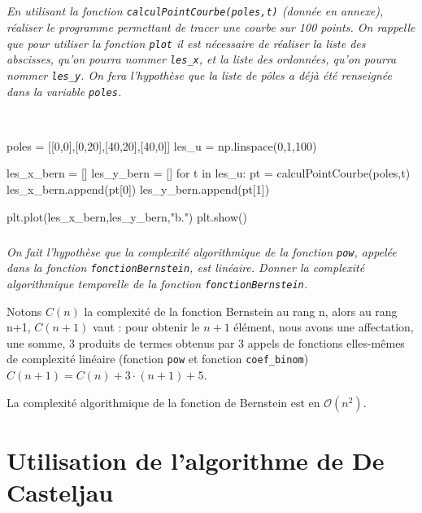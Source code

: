 \documentclass[10pt,fleqn]{article} %
\begin{document}
\subparagraph{}
\textit{En utilisant la fonction \texttt{calculPointCourbe(poles,t)} (donnée en annexe), réaliser le programme permettant de tracer une courbe sur 100 points. 
On rappelle que pour utiliser la fonction \texttt{plot} il est nécessaire de réaliser la liste des abscisses, qu'on pourra nommer \texttt{les\_x}, et la liste des ordonnées, qu'on pourra nommer \texttt{les\_y}. On fera l'hypothèse que la liste de pôles a déjà été renseignée dans la variable \texttt{poles}. }
\ifprof
\begin{corrige}~\\

\begin{py}
\begin{python}
poles = [[0,0],[0,20],[40,20],[40,0]]
les_u = np.linspace(0,1,100)

les_x_bern = []
les_y_bern = []
for t in les_u:
    pt = calculPointCourbe(poles,t)
    les_x_bern.append(pt[0])
    les_y_bern.append(pt[1])

plt.plot(les_x_bern,les_y_bern,"b.")
plt.show()
\end{python}
\end{py}    
\end{corrige}
\else
\fi

\subparagraph{}
\textit{On fait l'hypothèse que la complexité algorithmique de la fonction \texttt{pow}, appelée dans la fonction \texttt{fonctionBernstein}, est linéaire. Donner la complexité algorithmique temporelle de la fonction \texttt{fonctionBernstein}.}

\ifprof
\begin{corrige}
Notons $C(n)$ la complexité de la fonction Bernstein au rang n, alors au rang n+1, $C(n+1)$ vaut :
pour obtenir le $n+1$ élément, nous avons une affectation, une somme, 3 produits de termes obtenus par 3 appels de fonctions elles-mêmes de complexité linéaire (fonction \texttt{pow} et fonction \texttt{coef\_binom}) $C(n+1)=C(n)+3\cdot (n+1)+5$.

La complexité algorithmique de la fonction de Bernstein est en $\mathcal{O}\left(n^2\right)$.
\end{corrige}
\else
\fi


\section{Utilisation de l'algorithme de De Casteljau}
\ifprof
\else
\end{document}
